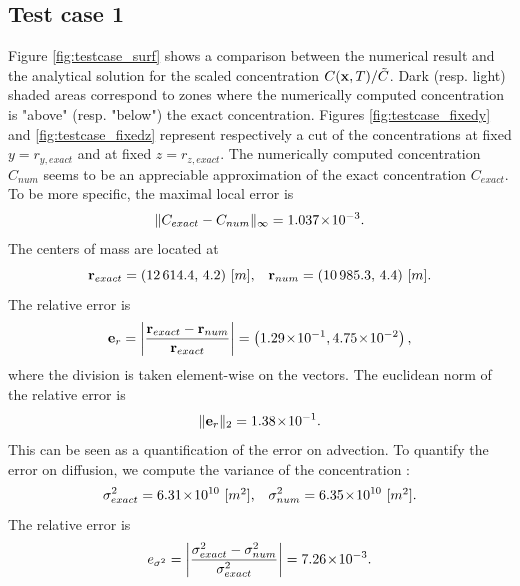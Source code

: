 \subsection{Test case 1}
Figure \ref{fig:testcase_surf} shows a comparison between the numerical result and the analytical solution for the scaled concentration $C(\mathbf x,T)/\tilde C$. Dark (resp. light) shaded areas correspond to zones where the numerically computed concentration is "above" (resp. "below") the exact concentration. Figures \ref{fig:testcase_fixedy} and \ref{fig:testcase_fixedz} represent respectively a cut of the concentrations at fixed $y = r_{y,exact}$ and at fixed $z = r_{z,exact}$. The numerically computed concentration $C_{num}$ seems to be an appreciable approximation of the exact concentration $C_{exact}$. To be more specific, the maximal local error is 
\begin{equation}
	\|C_{exact}-C_{num}\|_{\infty} = 1.037\!\times\!10^{-3}.
\end{equation}
The centers of mass are located at
\begin{equation}
	\mathbf r_{exact} = (12\,614.4,\,4.2) \mbox{ [$m$],}\quad \mathbf r_{num} = (10\,985.3,\,4.4) \mbox{ [$m$]}.
\end{equation}
The relative error is
\begin{equation}
	\mathbf e_r = \left \lvert \frac{\mathbf r_{exact}-\mathbf r_{num}}{\mathbf r_{exact}} \right \rvert =  \left(1.29\!\times\!10^{-1}, 4.75\!\times\!10^{-2}\right),
\end{equation}
where the division is taken element-wise on the vectors. The euclidean norm of the relative error is
\begin{equation}
	\| \mathbf e_r \|_2 = 1.38\!\times\!10^{-1}.
\end{equation}
This can be seen as a quantification of the error on advection. To quantify the error on diffusion, we compute the variance of the concentration :
\begin{equation}
	\sigma^2_{exact} = 6.31\!\times\!10^{10} \mbox{ [$m^2$],}\quad \sigma^2_{num} = 6.35\!\times\!10^{10} \mbox{ [$m^2$].}
\end{equation}
The relative error is
\begin{equation}
	e_{\sigma^2} = \left \lvert \frac{\sigma^2_{exact}-\sigma^2_{num}}{\sigma^2_{exact}}\right \rvert = 7.26\!\times\!10^{-3}.
\end{equation}

